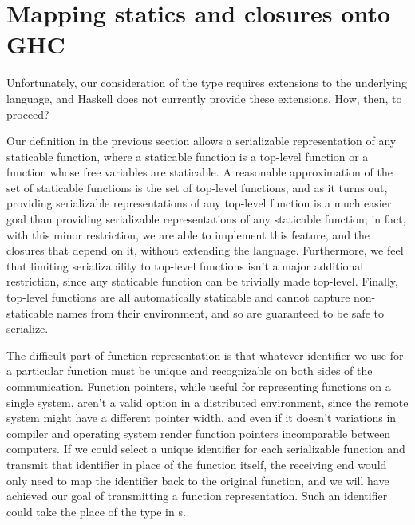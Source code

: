 \documentclass[preprint]{sigplanconf}
\begin{document}
% 
% 
% 
% 

\section{Mapping statics and closures onto GHC}

Unfortunately, our consideration of the  type 
requires extensions to the underlying language, and Haskell does not currently provide these extensions. How, then, to proceed?

Our definition in the previous section allows a serializable representation of any staticable function, where a staticable function is a top-level function or a function whose free variables are staticable. A reasonable approximation of the set of staticable functions is the set of top-level functions, and as it turns out, providing serializable representations of any top-level function is a much easier goal than providing serializable representations of any staticable function; in fact, with this minor restriction, we are able to implement this feature, and the closures that depend on it, without extending the language. Furthermore, we feel that limiting serializability to top-level functions isn't a major additional restriction, since any staticable function can be trivially made top-level. Finally, top-level functions are all automatically staticable and cannot capture non-staticable names from their environment, and so are guaranteed to be safe to serialize.

The difficult part of function representation is that whatever identifier we use for a particular function must be unique and recognizable on both sides of the communication. Function pointers, while useful for representing functions on a single system, aren't a valid option in a distributed environment, since the remote system might have a different pointer width, and even if it doesn't variations in compiler and operating system render function pointers incomparable between computers. If we could select a unique identifier for each serializable function and transmit that identifier in place of the function itself, the receiving end would only need to map the identifier back to the original function, and we will have achieved our goal of transmitting a function representation. Such an identifier could take the place of the  type in s.
\end{document}
